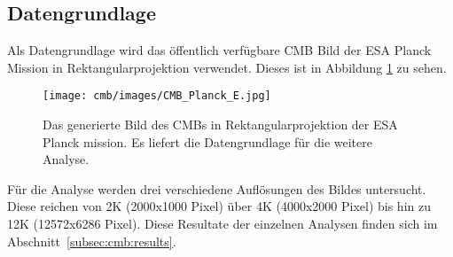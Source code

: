 \subsection{Datengrundlage}
Als Datengrundlage wird das öffentlich verfügbare CMB Bild der ESA Planck 
Mission in Rektangularprojektion \cite{cmb_public_equirectangular} 
verwendet. Dieses ist in Abbildung \ref{fig:cmb-rectangular} zu sehen.

\begin{figure}
	\centering
	\texttt{[image: cmb/images/CMB\_Planck\_E.jpg]}
	\caption{Das generierte Bild des CMBs in Rektangularprojektion der ESA 
		Planck mission. Es liefert die Datengrundlage für die weitere Analyse.}
	\label{fig:cmb-rectangular}
\end{figure}

Für die Analyse werden drei verschiedene Auflösungen des Bildes untersucht. 
Diese reichen von 2K (2000x1000 Pixel) über 4K (4000x2000 Pixel) bis hin zu 12K 
(12572x6286 Pixel). Diese Resultate der einzelnen Analysen finden sich im 
Abschnitt~\ref{subsec:cmb:results}.

